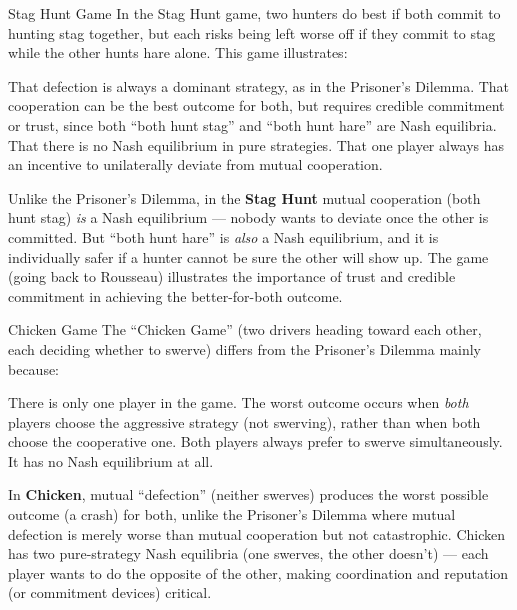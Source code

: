 \begin{question}[type=mc]{Stag Hunt Game}
In the Stag Hunt game, two hunters do best if both commit to hunting stag
together, but each risks being left worse off if they commit to stag while
the other hunts hare alone. This game illustrates:
\begin{choices}
  \choice        That defection is always a dominant strategy, as in the
                 Prisoner's Dilemma.
  \correctchoice That cooperation can be the best outcome for both, but
                 requires credible commitment or trust, since both ``both
                 hunt stag'' and ``both hunt hare'' are Nash equilibria.
  \choice        That there is no Nash equilibrium in pure strategies.
  \choice        That one player always has an incentive to unilaterally
                 deviate from mutual cooperation.
  
\end{choices}
\begin{solution}
  Unlike the Prisoner's Dilemma, in the \textbf{Stag Hunt} mutual cooperation
  (both hunt stag) \emph{is} a Nash equilibrium — nobody wants to deviate
  once the other is committed. But ``both hunt hare'' is \emph{also} a Nash
  equilibrium, and it is individually safer if a hunter cannot be sure the
  other will show up. The game (going back to Rousseau) illustrates the
  importance of trust and credible commitment in achieving the
  better-for-both outcome.
\end{solution}
\end{question}

\begin{question}[type=mc]{Chicken Game}
The ``Chicken Game'' (two drivers heading toward each other, each deciding
whether to swerve) differs from the Prisoner's Dilemma mainly because:
\begin{choices}
  \choice        There is only one player in the game.
  \correctchoice The worst outcome occurs when \emph{both} players choose the
                 aggressive strategy (not swerving), rather than when both
                 choose the cooperative one.
  \choice        Both players always prefer to swerve simultaneously.
  \choice        It has no Nash equilibrium at all.
\end{choices}
\begin{solution}
  In \textbf{Chicken}, mutual ``defection'' (neither swerves) produces the
  worst possible outcome (a crash) for both, unlike the Prisoner's Dilemma
  where mutual defection is merely worse than mutual cooperation but not
  catastrophic. Chicken has two pure-strategy Nash equilibria (one swerves,
  the other doesn't) — each player wants to do the opposite of the other,
  making coordination and reputation (or commitment devices) critical.
\end{solution}
\end{question}


